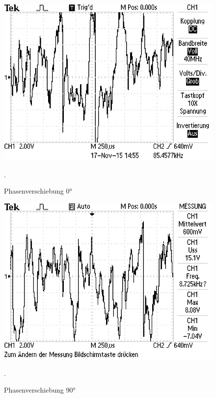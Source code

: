  \begin{figure}
   \centering
   \includegraphics[width=\textwidth]{bilder/Mit Rauschen/1.JPG}
 \caption{Phasenverschiebung 0°}.
   \label{fig:1}
 \end{figure}

 \begin{figure}
   \centering
   \includegraphics[width=\textwidth]{bilder/Mit Rauschen/2.JPG}
 \caption{Phasenverschiebung 90°}.
   \label{fig:2}
 \end{figure}

